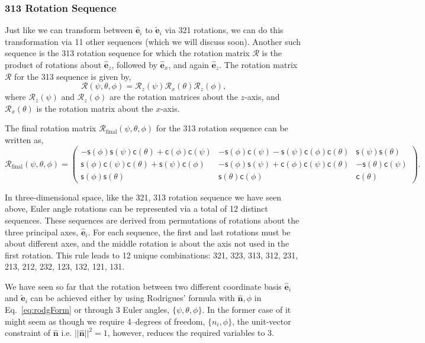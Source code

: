 \documentclass{article}
\def\nh{\hat{\mathbf{n}}}
\def\eh{\hat{\mathbf{e}}}
\def\et{\tilde{\mathbf{e}}}
\def\R{\mathcal{R}}
\def\c{\textsf{c}}
\def\s{\textsf{s}}
\def\nh{\hat{\mathbf{n}}}
\begin{document}
\subsubsection*{313 Rotation Sequence}
Just like we can transform between $\eh_i$ to $\et_i$ via 321 rotations, we can do this transformation via 11 other sequences (which we will discuss soon). Another such sequence is the 313 rotation sequence for which the rotation matrix $\R$ is the product of rotations about $\eh_z$, followed by $\eh_x$, and again $\eh_z$. The rotation matrix  $\R$ for the 313 sequence is given by,
\[
  \R (\psi, \theta, \phi) = \R_z(\psi) \R_x(\theta) \R_z(\phi),
\]
where \( \R_z(\psi) \) and \( \R_z(\phi) \) are the rotation matrices about the $z$-axis, and \( \R_x(\theta) \) is the rotation matrix about the $x$-axis. 

\noindent The final rotation matrix \( \R_{\text{final}} (\psi, \theta, \phi) \) for the 313 rotation sequence can be written as,
\[
\R_{\text{final}} (\psi, \theta, \phi) = \begin{pmatrix}
-\s(\phi)\s(\psi)\c(\theta) + \c(\phi)\c(\psi) & -\s(\phi)\c(\psi) - \s(\psi)\c(\phi)\c(\theta) & \s(\psi)\s(\theta) \\
\s(\phi)\c(\psi)\c(\theta) + \s(\psi)\c(\phi) & -\s(\phi)\s(\psi) + \c(\phi)\c(\psi)\c(\theta) & -\s(\theta)\c(\psi) \\
\s(\phi)\s(\theta) & \s(\theta)\c(\phi) & \c(\theta)
\end{pmatrix}.
\]

\noindent In three-dimensional space, like the 321, 313 rotation sequence we have seen above, Euler angle rotations can be represented via a total of 12 distinct sequences. These sequences are derived from permutations of rotations about the three principal axes, $\eh_i$. For each sequence, the first and last rotations must be about different axes, and the middle rotation is about the axis not used in the first rotation. This rule leads to 12 unique combinations: 321, 323, 313, 312, 231, 213, 212, 232, 123, 132, 121, 131.

We have seen so far that the rotation between two different coordinate basis $\eh_i$ and $\et_i$ can be achieved either by using Rodrigues' formula with $\nh, \phi$ in Eq.~\ref{eq:rodgForm} or through 3 Euler angles, $\{\psi, \theta, \phi\}$. In the former case of it might seem as though we require 4--degrees of freedom, $\{ n_i, \phi \}$, the unit-vector constraint of $\nh$ i.e. $||\nh||^2 = 1$, however, reduces the required variables to 3.
\end{document}
